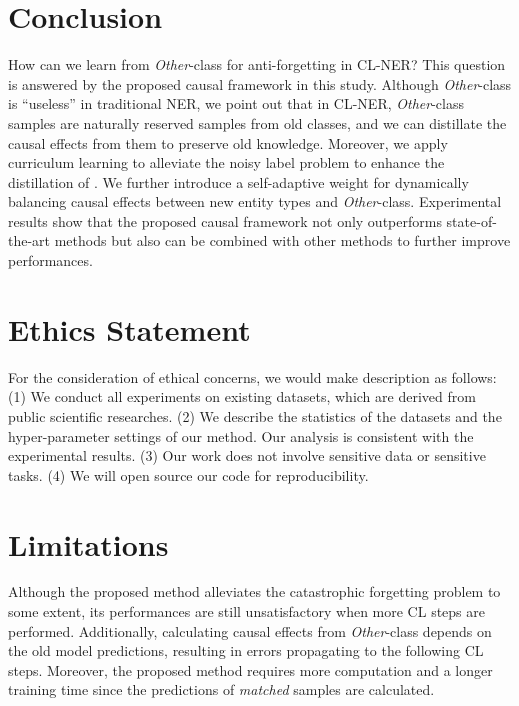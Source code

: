 \documentclass[11pt]{article}
\begin{document}
\section{Conclusion}
How can we learn from \textit{Other}-class for anti-forgetting in CL-NER?
This question is answered by the proposed causal framework in this study.
Although \textit{Other}-class is ``useless'' in traditional NER, we point out that in CL-NER, \textit{Other}-class samples are naturally reserved samples from old classes, and we can distillate the causal effects from them to preserve old knowledge.
Moreover, we apply curriculum learning to alleviate the noisy label problem to enhance the distillation of .
We further introduce a self-adaptive weight for dynamically balancing causal effects between new entity types and \textit{Other}-class.
Experimental results show that the proposed causal framework not only outperforms state-of-the-art methods but also can be combined with other methods to further improve performances.

\section*{Ethics Statement}
For the consideration of ethical concerns, we would make description as follows:
(1) We conduct all experiments on existing datasets, which are derived from public scientific researches.
(2) We describe the statistics of the datasets and the hyper-parameter settings of our method. Our analysis is consistent with the experimental results.
(3) Our work does not involve sensitive data or sensitive tasks.
(4) We will open source our code for reproducibility.

\section*{Limitations}
Although the proposed method alleviates the catastrophic forgetting problem to some extent, its performances are still unsatisfactory when more CL steps are performed.
Additionally, calculating causal effects from \textit{Other}-class depends on the old model predictions, resulting in errors propagating to the following CL steps.
Moreover, the proposed method requires more computation and a longer training time since the predictions of \textit{matched} samples are calculated.






\appendix
\end{document}
